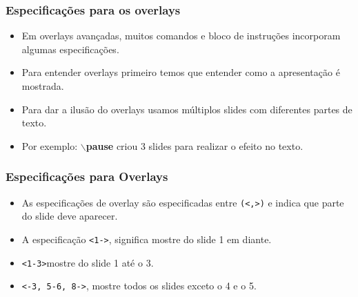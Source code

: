 \begin{frame}[fragile]
  \frametitle{Especificações para os overlays}

  \begin{itemize}[<+->]
     \item Em overlays avançadas, muitos comandos e bloco de instruções incorporam algumas
           especificações.
     \item Para entender overlays primeiro temos que entender como a apresentação é mostrada.
     \item Para dar a ilusão do overlays usamos múltiplos slides com diferentes partes de texto.
     \item Por exemplo: \textbf{$\backslash$pause} criou 3 slides para realizar o efeito no texto.
  \end{itemize}

\end{frame}


\begin{frame}[fragile]
  \frametitle{Especificações para Overlays}

  \begin{itemize}
     \item As especificações de overlay são especificadas entre \verb|(<,>)| e indica que parte do slide
           deve aparecer.
     \item A especificação \verb|<1->|, significa mostre do slide 1 em diante.
     \item \verb|<1-3>|mostre do slide 1 até o 3.
     \item \verb|<-3, 5-6, 8->|, mostre todos os slides exceto o 4 e o 5.
  \end{itemize}
\end{frame}


